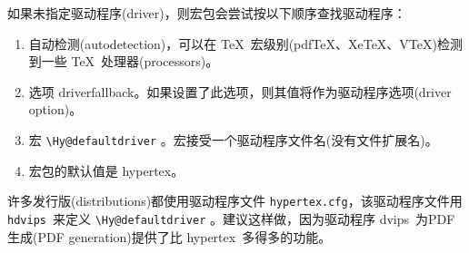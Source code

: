 \documentclass{article}
\newcommand*{\cs}[1]{%
  \texttt{\textbackslash #1}%
}
\begin{document}
如果未指定驱动程序(driver)，则宏包会尝试按以下顺序查找驱动程序：
\begin{enumerate}
  \item 自动检测(autodetection)，可以在 \TeX\ 宏级别(pdf\TeX、Xe\TeX、V\TeX)检测到一些 \TeX\ 处理器(processors)。
  \item 选项 \textsf{driverfallback}。如果设置了此选项，则其值将作为驱动程序选项(driver option)。
  \item 宏 \cs{Hy@defaultdriver}。宏接受一个驱动程序文件名(没有文件扩展名)。
  \item 宏包的默认值是 \textsf{hypertex}。
\end{enumerate}
许多发行版(distributions)都使用驱动程序文件 \texttt{hypertex.cfg}，该驱动程序文件用 \texttt{hdvips}\ 来定义 \cs{Hy@defaultdriver}。建议这样做，因为驱动程序 \textsf{dvips}\ 为PDF生成(PDF generation)提供了比 \textsf{hypertex}\ 多得多的功能。
\end{document}
